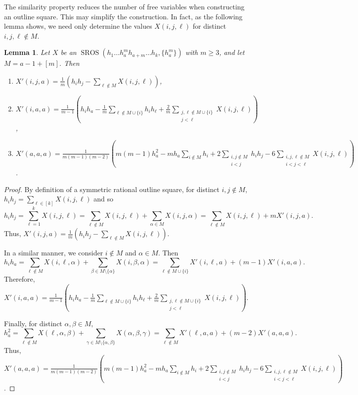 \documentclass[preprint,nonatbib]{elsarticle}
\DeclareMathOperator{\SROS}{SROS}
\newtheorem{lemma}[theorem]{Lemma}
\theoremstyle{definition}
\numberwithin{equation}{section}
\begin{document}
The similarity property reduces the number of free variables when constructing an outline square. This may simplify the construction. In fact, as the following lemma shows, we need only determine the values $X(i,j,\ell)$ for distinct $i,j,\ell\notin M$.

\begin{lemma}
\label{lemma: similar only needs distinct triples}
    Let $X$ be an $\SROS(h_1\dots h_a^m h_{a+m}\dots h_k, \{h_a^m\})$ with $m\geq 3$, and let $M = a-1+[m]$. Then
    \begin{enumerate}[label=\textup{(\arabic*)}]
        \item $X'(i,j,a) = \displaystyle\frac{1}{m}\left(h_ih_j - \sum_{\ell\notin M}X(i,j,\ell)\right)$,
        \item $\displaystyle X'(i,a,a) = \frac{1}{m-1}\left(h_ih_a - \frac{1}{m}\sum_{\ell\notin M\cup\{i\}} h_ih_\ell + \frac{2}{m}\sum_{\substack{j,\ell\notin M\cup\{i\}\\ j<\ell}} X(i,j,\ell)\right)$,
        \item $X'(a,a,a) = \displaystyle\frac{1}{m(m-1)(m-2)}\left(m(m-1)h_a^2 - mh_a\sum_{i\notin M}h_i + 2\sum_{\substack{i,j\notin M\\ i<j}}h_ih_j - 6\sum_{\substack{i,j,\ell\notin M\\ i<j<\ell}}X(i,j,\ell)\right)$.
    \end{enumerate}
\end{lemma}
\begin{proof}
    By definition of a symmetric rational outline square, for distinct $i,j\notin M$, $h_ih_j = \sum_{\ell\in[k]} X(i,j,\ell)$ and so
    $$h_ih_j = \sum_{\ell=1}^k X(i,j,\ell) = \sum_{\ell\notin M}X(i,j,\ell) + \sum_{\alpha\in M}X(i,j,\alpha) = \sum_{\ell\notin M}X(i,j,\ell) + mX'(i,j,a).$$
    Thus, $X'(i,j,a) = \displaystyle\frac{1}{m}\left(h_ih_j - \sum_{\ell\notin M}X(i,j,\ell)\right)$.

    In a similar manner, we consider $i\notin M$ and $\alpha\in M$. Then
    $$h_ih_a = \sum_{\ell\notin M}X(i,\ell,\alpha) + \sum_{\beta\in M\setminus\{\alpha\}}X(i,\beta,\alpha) = \sum_{\ell\notin M\cup\{i\}}X'(i,\ell,a) + (m-1)X'(i,a,a).$$ Therefore, $\displaystyle X'(i,a,a) = \frac{1}{m-1}\left(h_ih_a - \frac{1}{m}\sum_{\ell\notin M\cup\{i\}} h_ih_\ell + \frac{2}{m}\sum_{\substack{j,\ell\notin M\cup\{i\}\\ j<\ell}} X(i,j,\ell)\right)$.

    Finally, for distinct $\alpha,\beta\in M$, $$h_a^2 = \sum_{\ell\notin M}X(\ell,\alpha,\beta) + \sum_{\gamma\in M\setminus\{\alpha,\beta\}}X(\alpha,\beta,\gamma) = \sum_{\ell\notin M} X'(\ell,a,a) + (m-2)X'(a,a,a).$$
    Thus, $X'(a,a,a) = \displaystyle\frac{1}{m(m-1)(m-2)}\left(m(m-1)h_a^2 - mh_a\sum_{i\notin M}h_i + 2\sum_{\substack{i,j\notin M\\ i<j}}h_ih_j - 6\sum_{\substack{i,j,\ell\notin M\\ i<j<\ell}}X(i,j,\ell)\right)$.
\end{proof}
\end{document}
